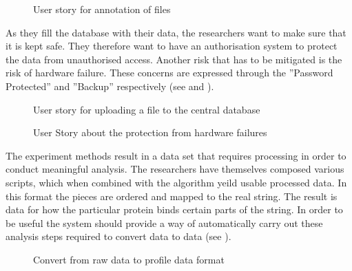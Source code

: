 \begin{figure}[h]
\caption{User story for annotation of files}
\label{fig:target_annotation}
\end{figure}

As they fill the database with their data, the researchers want to make sure that it is kept safe. They therefore want to have an authorisation system to protect the data from unauthorised access. Another risk that has to be mitigated is the risk of hardware failure. These concerns are expressed through the  ''Password Protected'' and ''Backup'' respectively (see  and ).

\begin{figure}[h]
\caption{User story for uploading a file to the central database}
\label{fig:target_password}
\end{figure}

\begin{figure}[h]
\caption{User Story about the protection from hardware failures}
\label{fig:target_backup}
\end{figure}

The experiment methods result in a data set that requires processing in order to conduct meaningful analysis. The researchers have themselves composed various scripts, which when combined with the   algorithm yeild usable processed  data. In this format the  pieces are ordered and mapped to the real  string. The result is data for how the particular protein binds certain parts of the  string. In order to be useful the system should provide a way of automatically carry out these analysis steps required to convert  data to  data (see ). 

\begin{figure}[h]
\caption{Convert from raw data to profile data format}
\label{fig:target_r2p}
\end{figure}

